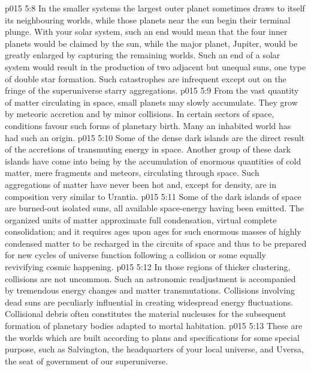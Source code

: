 \vs p015 5:8 \bibnobreakspace {} In the smaller systems the largest outer planet sometimes draws to itself its neighbouring worlds, while those planets near the sun begin their terminal plunge. With your solar system, such an end would mean that the four inner planets would be claimed by the sun, while the major planet, Jupiter, would be greatly enlarged by capturing the remaining worlds. Such an end of a solar system would result in the production of two adjacent but unequal suns, one type of double star formation. Such catastrophes are infrequent except out on the fringe of the superuniverse starry aggregations.
\vs p015 5:9 \bibnobreakspace {} From the vast quantity of matter circulating in space, small planets may slowly accumulate. They grow by meteoric accretion and by minor collisions. In certain sectors of space, conditions favour such forms of planetary birth. Many an inhabited world has had such an origin.
\vs p015 5:10 Some of the dense dark islands are the direct result of the accretions of transmuting energy in space. Another group of these dark islands have come into being by the accumulation of enormous quantities of cold matter, mere fragments and meteors, circulating through space. Such aggregations of matter have never been hot and, except for density, are in composition very similar to Urantia.
\vs p015 5:11 \bibnobreakspace {} Some of the dark islands of space are burned\hyp{}out isolated suns, all available space\hyp{}energy having been emitted. The organized units of matter approximate full condensation, virtual complete consolidation; and it requires ages upon ages for such enormous masses of highly condensed matter to be recharged in the circuits of space and thus to be prepared for new cycles of universe function following a collision or some equally revivifying cosmic happening.
\vs p015 5:12 \bibnobreakspace {} In those regions of thicker clustering, collisions are not uncommon. Such an astronomic readjustment is accompanied by tremendous energy changes and matter transmutations. Collisions involving dead suns are peculiarly influential in creating widespread energy fluctuations. Collisional debris often constitutes the material nucleuses for the subsequent formation of planetary bodies adapted to mortal habitation.
\vs p015 5:13 \bibnobreakspace {} These are the worlds which are built according to plans and specifications for some special purpose, such as Salvington, the headquarters of your local universe, and Uversa, the seat of government of our superuniverse.
